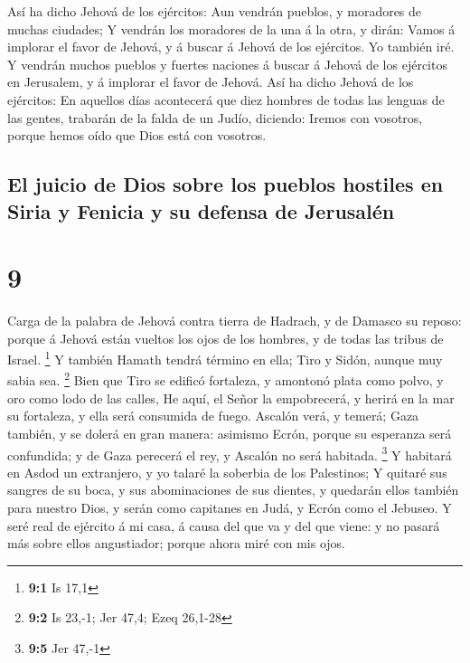  Así ha dicho Jehová de los ejércitos: Aun vendrán
pueblos, y moradores de muchas ciudades;  Y vendrán los
moradores de la una á la otra, y dirán: Vamos á implorar el favor de
Jehová, y á buscar á Jehová de los ejércitos. Yo también iré.
 Y vendrán muchos pueblos y fuertes naciones á buscar á
Jehová de los ejércitos en Jerusalem, y á implorar el favor de Jehová.
 Así ha dicho Jehová de los ejércitos: En aquellos días
acontecerá que diez hombres de todas las lenguas de las gentes, trabarán
de la falda de un Judío, diciendo: Iremos con vosotros, porque hemos
oído que Dios está con vosotros.

\hypertarget{el-juicio-de-dios-sobre-los-pueblos-hostiles-en-siria-y-fenicia-y-su-defensa-de-jerusaluxe9n}{%
\subsection{El juicio de Dios sobre los pueblos hostiles en Siria y
Fenicia y su defensa de
Jerusalén}\label{el-juicio-de-dios-sobre-los-pueblos-hostiles-en-siria-y-fenicia-y-su-defensa-de-jerusaluxe9n}}

\hypertarget{section-8}{%
\section{9}\label{section-8}}

 Carga de la palabra de Jehová contra tierra de Hadrach, y
de Damasco su reposo: porque á Jehová están vueltos los ojos de los
hombres, y de todas las tribus de Israel. \footnote{\textbf{9:1} Is 17,1}
 Y también Hamath tendrá término en ella; Tiro y Sidón,
aunque muy sabia sea. \footnote{\textbf{9:2} Is 23,-1; Jer 47,4; Ezeq
  26,1-28}  Bien que Tiro se edificó fortaleza, y amontonó
plata como polvo, y oro como lodo de las calles,  He aquí,
el Señor la empobrecerá, y herirá en la mar su fortaleza, y ella será
consumida de fuego.  Ascalón verá, y temerá; Gaza también,
y se dolerá en gran manera: asimismo Ecrón, porque su esperanza será
confundida; y de Gaza perecerá el rey, y Ascalón no será habitada.
\footnote{\textbf{9:5} Jer 47,-1}  Y habitará en Asdod un
extranjero, y yo talaré la soberbia de los Palestinos;  Y
quitaré sus sangres de su boca, y sus abominaciones de sus dientes, y
quedarán ellos también para nuestro Dios, y serán como capitanes en
Judá, y Ecrón como el Jebuseo.  Y seré real de ejército á
mi casa, á causa del que va y del que viene: y no pasará más sobre ellos
angustiador; porque ahora miré con mis ojos.

